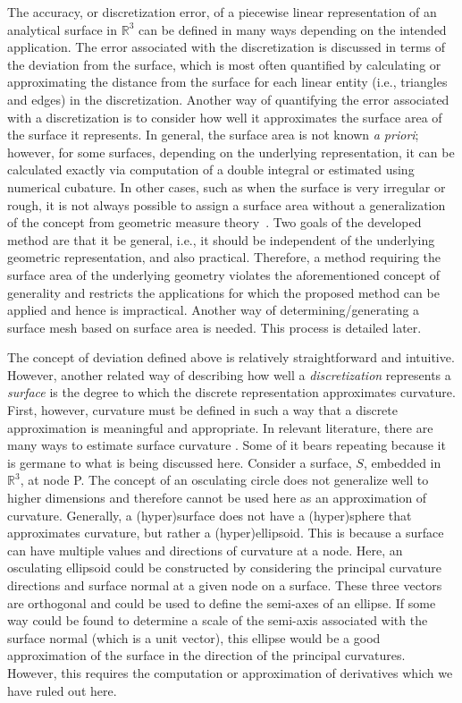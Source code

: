 The accuracy, or discretization error, of a piecewise linear
representation of an analytical surface in ${\mathbb R}^3$ can be
defined in many ways depending on the intended application. The error
associated with the discretization is discussed in terms of the
deviation from the surface, which is most often quantified by calculating 
or approximating the distance from the surface for each linear entity
(i.e., triangles and edges) in the discretization.  Another way of 
quantifying
the error associated with a discretization is to consider how well
it approximates the surface area of the surface it represents.  In
general, the surface area is not known {\it a priori}; however, for some
surfaces, depending on the underlying representation, it can be 
calculated exactly via computation of a double integral or estimated using 
numerical cubature.  In other cases, such as when the surface is very 
irregular or rough, it is not always possible to assign a surface area
without a generalization of the concept from geometric measure 
theory~\cite{gmt}.  Two goals of the developed 
method are that it be general, i.e., it 
should be independent of the underlying geometric representation, and 
also practical.  Therefore, a method requiring the surface area of the 
underlying geometry violates the aforementioned concept of 
generality and restricts the applications for which the proposed method 
can be applied and hence is impractical.  Another way of 
determining/generating a surface mesh based on surface area is needed. 
This process is detailed later.

The concept of deviation defined above is relatively straightforward and
intuitive. However, another related way of describing how well a
\textit{discretization} represents a \textit{surface} is the degree to
which the discrete representation approximates curvature. First,
however, curvature must be defined in such a way that a discrete
approximation is meaningful and appropriate. In relevant literature,
there are many ways to estimate surface curvature \cite{hermann07}. Some
of it bears repeating because it is germane to what is being discussed
here.  Consider a surface, $S$, embedded in ${\mathbb R}^3$, at node P.
The concept of an osculating circle \cite{weissteineOsculatingCircle}
does not generalize well to higher dimensions and therefore cannot be
used here as an approximation of curvature. Generally, a (hyper)surface
does not have a (hyper)sphere that approximates curvature, but rather a
(hyper)ellipsoid. This is because a surface can have multiple values and
directions of curvature at a node. Here, an osculating ellipsoid could
be constructed by considering the principal curvature directions and
surface normal at a given node on a surface. These three vectors are
orthogonal and could be used to define the semi-axes of an ellipse. If
some way could be found to determine a scale of the semi-axis associated
with the surface normal (which is a unit vector), this ellipse would be
a good approximation of the surface in the direction of the principal
curvatures. However, this requires the computation or approximation of
derivatives which we have ruled out here.

